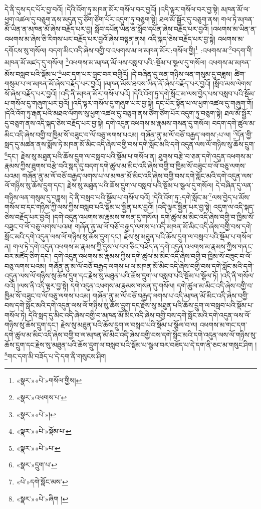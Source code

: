 དེ་ནི་དུས་དང་པོར་བྱ་བའོ། །དེའི་འོག་ཏུ་མཁན་མོར་གསོལ་བར་བྱའོ། །འདི་ལྟར་གསོལ་བར་བྱ་སྟེ། མཁན་མོ་ལ་ཕྱག་འཚལ་དུ་བཅུག་ནས་མདུན་དུ་ཙོག་ཙོག་པོར་འདུག་ཏུ་བཅུག་སྟེ། ཐལ་མོ་སྦྱོར་དུ་བཅུག་ནས། གལ་ཏེ་མཁན་མོ་ཡིན་ན་མཁན་མོ་ཞེས་བརྗོད་པར་བྱ། སློབ་དཔོན་ཡིན་ན་སློབ་དཔོན་ཞེས་བརྗོད་པར་བྱའོ། །འཕགས་མ་ཡིན་ན་འཕགས་མ་ཞེས་ཅི་རིགས་པར་བརྗོད་པར་བྱའོ་ཞེས་བསྟན་ནས། འདི་སྐད་ཅེས་བརྗོད་པར་བྱ་སྟེ། འཕགས་མ་དགོངས་སུ་གསོལ། བདག་མིང་འདི་ཞེས་བགྱི་བ་འཕགས་མ་ལ་མཁན་མོར་:གསོལ་གྱི།\footnote{«སྣར་»«པེ་»གསོལ་གྱིས།} :འཕགས་མ་\footnote{«སྣར་»འཕགས་པ་}བདག་གི་མཁན་མོ་མཛད་དུ་གསོལ། \footnote{«སྣར་»«པེ་»།  }འཕགས་མ་མཁན་མོ་ལས་བསླབ་པའི་:སྡོམ་པ་སྩལ་དུ་གསོལ། འཕགས་མ་མཁན་མོས་བསླབ་པའི་སྡོམ་པ་\footnote{«སྣར་»«པེ་»སྡོམ་པ་}ཡང་དག་པར་བླང་བར་བགྱིའོ། །དེ་བཞིན་དུ་ལན་གཉིས་ལན་གསུམ་དུ་བཟླས། ཚིག་གསུམ་པ་ལ་མཁན་མོ་ཞེས་བརྗོད་པར་བྱའོ། །མཁན་མོས་ཐབས་ཡིན་ནོ་ཞེས་བརྗོད་པར་བྱའོ། །སློབ་མས་ལེགས་སོ་ཞེས་བརྗོད་པར་བྱའོ། །འདི་ནི་མཁན་མོར་གསོལ་པའོ། །དེའི་འོག་ཏུ་དགེ་སློང་མ་ལས་བྱེད་པས་བསླབ་པའི་སྡོམ་པ་གསོལ་དུ་གཞུག་པར་བྱའོ། །འདི་ལྟར་གསོལ་དུ་གཞུག་པར་བྱ་སྟེ། དང་པོར་སྟོན་པ་ལ་ཕྱག་འཚལ་དུ་གཞུག་གོ། །དེའི་འོག་ཏུ་རྒན་པའི་མཐའ་ལོགས་སུ་ཕྱག་འཚལ་དུ་བཅུག་ནས་ཙོག་ཙོག་པོར་འདུག་ཏུ་བཅུག་སྟེ། ཐལ་མོ་སྦྱོར་དུ་བཅུག་ནས་འདི་སྐད་ཅེས་བརྗོད་པར་བྱ་སྟེ། དགེ་འདུན་འཕགས་མ་རྣམས་གསན་དུ་གསོལ། བདག་དགེ་ཚུལ་མ་མིང་འདི་ཞེས་བགྱི་བ་ཁྱིམ་སོ་བཟུང་བ་ལོ་བཅུ་ལགས་པའམ། གཞོན་ནུ་མ་ལོ་བཅོ་བརྒྱད་ལགས་:པ་ལ། \footnote{«སྣར་»«པེ་»པ་}དོན་གྱི་སླད་དུ་མཚན་ནས་སྨོས་ཏེ་མཁན་མོ་མིང་འདི་ཞེས་བགྱི་བས་དགེ་སློང་མའི་དགེ་འདུན་ལས་ལོ་གཉིས་སུ་ཆོས་དྲུག་\footnote{«སྣར་»དྲུག་པ་}དང་། རྗེས་སུ་མཐུན་པའི་ཆོས་དྲུག་ལ་བསླབ་པའི་སྡོམ་པ་གསོལ་ན། ཐུགས་བརྩེ་བ་ཅན་དགེ་འདུན་འཕགས་མ་རྣམས་ཀྱིས་ཐུགས་བརྩེ་བའི་སླད་དུ་བདག་དགེ་ཚུལ་མ་མིང་འདི་ཞེས་བགྱི་བ་ཁྱིམ་སོ་བཟུང་བ་ལོ་བཅུ་ལགས་པའམ། གཞོན་ནུ་མ་ལོ་བཅོ་བརྒྱད་ལགས་པ་ལ་མཁན་མོ་མིང་འདི་ཞེས་བགྱི་བས་དགེ་སློང་མའི་དགེ་འདུན་ལས་ལོ་གཉིས་སུ་ཆོས་དྲུག་དང་། རྗེས་སུ་མཐུན་པའི་ཆོས་དྲུག་ལ་བསླབ་པའི་སྡོམ་པ་སྩལ་དུ་གསོལ། དེ་བཞིན་དུ་ལན་གཉིས་ལན་གསུམ་དུ་བཟླས། དེ་ནི་བསླབ་པའི་སྡོམ་པ་གསོལ་བའོ། །དེའི་འོག་ཏུ་:དགེ་སློང་མ་\footnote{«པེ་»དགེ་སློང་མས་}ལས་བྱེད་པ་མོས་གསོལ་བ་དང་གཉིས་ཀྱི་ལས་ཀྱིས་བསླབ་པའི་སྡོམ་པ་སྦྱིན་པར་བྱའོ། །འདི་ལྟར་སྦྱིན་པར་བྱ་སྟེ། འདུག་ལ་འདི་སྐད་ཅེས་བརྗོད་པར་བྱའོ། །དགེ་འདུན་འཕགས་མ་རྣམས་གསན་དུ་གསོལ། དགེ་ཚུལ་མ་མིང་འདི་ཞེས་བགྱི་བ་ཁྱིམ་སོ་བཟུང་བ་ལོ་བཅུ་ལགས་པའམ། གཞོན་ནུ་མ་ལོ་བཅོ་བརྒྱད་ལགས་པ་འདི་མཁན་མོ་མིང་འདི་ཞེས་བགྱི་བས་དགེ་སློང་མའི་དགེ་འདུན་ལས་ལོ་གཉིས་སུ་ཆོས་དྲུག་དང་། རྗེས་སུ་མཐུན་པའི་ཆོས་དྲུག་ལ་བསླབ་པའི་སྡོམ་པ་གསོལ་ན། གལ་ཏེ་དགེ་འདུན་འཕགས་མ་རྣམས་ཀྱི་དུས་ལ་བབ་ཅིང་བཟོད་ན་དགེ་འདུན་འཕགས་མ་རྣམས་ཀྱིས་གནང་བར་མཛོད་ཅིག་དང་། དགེ་འདུན་འཕགས་མ་རྣམས་ཀྱིས་དགེ་ཚུལ་མ་མིང་འདི་ཞེས་བགྱི་བ་ཁྱིམ་སོ་བཟུང་བ་ལོ་བཅུ་ལགས་པའམ། གཞོན་ནུ་མ་ལོ་བཅོ་བརྒྱད་ལགས་པ་ལ་མཁན་མོ་མིང་འདི་ཞེས་བགྱི་བས་དགེ་སློང་མའི་དགེ་འདུན་ལས་ལོ་གཉིས་སུ་ཆོས་དྲུག་དང་རྗེས་སུ་མཐུན་པའི་ཆོས་དྲུག་ལ་བསླབ་པའི་སྡོམ་པ་སྩོལ་ཏོ། །འདི་ནི་གསོལ་བའོ། །ལས་ནི་འདི་ལྟར་བྱ་སྟེ། དགེ་འདུན་འཕགས་མ་རྣམས་གསན་དུ་གསོལ། དགེ་ཚུལ་མ་མིང་འདི་ཞེས་བགྱི་བ་ཁྱིམ་སོ་བཟུང་བ་ལོ་བཅུ་ལགས་པའམ། གཞོན་ནུ་མ་ལོ་བཅོ་བརྒྱད་ལགས་པ་འདི་མཁན་མོ་མིང་འདི་ཞེས་བགྱི་བས་དགེ་སློང་མའི་དགེ་འདུན་ལས་ལོ་གཉིས་སུ་ཆོས་དྲུག་དང་རྗེས་སུ་མཐུན་པའི་ཆོས་དྲུག་ལ་བསླབ་པའི་སྡོམ་པ་གསོལ་ཏེ། དེའི་སླད་དུ་མིང་འདི་ཞེས་བགྱི་བ་མཁན་མོ་མིང་འདི་ཞེས་བགྱི་བས་དགེ་སློང་མའི་དགེ་འདུན་ལས་ལོ་གཉིས་སུ་ཆོས་དྲུག་དང་། རྗེས་སུ་མཐུན་པའི་ཆོས་དྲུག་ལ་བསླབ་པའི་སྡོམ་པ་སྩོལ་བ་ལ། འཕགས་མ་གང་དག་དགེ་ཚུལ་མ་མིང་འདི་ཞེས་བགྱི་བ་ལ་མཁན་མོ་མིང་འདི་ཞེས་བགྱི་བས་དགེ་སློང་མའི་དགེ་འདུན་ལས་ལོ་གཉིས་སུ་ཆོས་དྲུག་དང་རྗེས་སུ་མཐུན་པའི་ཆོས་དྲུག་ལ་བསླབ་པའི་སྡོམ་པ་སྩལ་བར་བཟོད་པ་དེ་དག་ནི་ཅང་མ་གསུང་ཤིག །\footnote{«སྣར་»«པེ་»ཞིག །}གང་དག་མི་བཟོད་པ་དེ་དག་ནི་གསུངས་ཤིག 